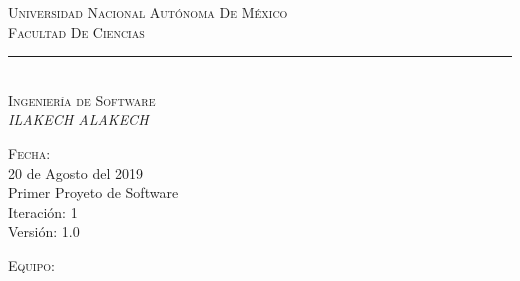\documentclass{article}
\begin{document}
	\marginsize{2cm}{2cm}{1cm}{2cm} 
\begin{titlepage}
\begin{center}
{\LARGE \scshape Universidad Nacional Autónoma De México\\
Facultad De Ciencias\\\vspace{10mm} }

\centering

\rule{0.8\textwidth}{.8pt}\\
{\huge \Huge \scshape Ingeniería de Software\\
\vspace{10mm}
\textit{ILAKECH ALAKECH}}\\

\begin{center}
  
\end{center}
\vspace{10mm} %
{\huge \scshape Fecha:}\\
\vspace{5mm} %
{\huge 20 de Agosto del 2019}\\[1cm]
\vspace{5mm} %
{\huge Primer Proyeto de Software}\\[1cm]
\vspace{5mm} %
{\huge Iteración: 1}\\[1cm]
\vspace{5mm} %
{\huge Versión: 1.0}\\[1cm]
\vspace{5mm} %

{\huge \scshape Equipo:}\\
\vspace{3mm}


\vspace{10mm} %

\vfill %

\end{center}
\end{titlepage}
\end{document}
